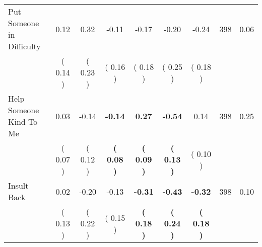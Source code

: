 \begin{tabular}{lcccccccc}
Put Someone in Difficulty &      0.12 &      0.32 &     -0.11 &     -0.17 &     -0.20 &     -0.24 & 398 &       0.06 \\ 
 & (     0.14 ) & (     0.23 ) & (     0.16 ) & (     0.18 ) & (     0.25 ) & (     0.18 ) & \\
Help Someone Kind To Me &      0.03 &     -0.14 & \textbf{    -0.14} & \textbf{     0.27} & \textbf{    -0.54} &      0.14 & 398 &       0.25 \\ 
 & (     0.07 ) & (     0.12 ) & \textbf{(     0.08 )} & \textbf{(     0.09 )} & \textbf{(     0.13 )} & (     0.10 ) & \\
Insult Back &      0.02 &     -0.20 &     -0.13 & \textbf{    -0.31} & \textbf{    -0.43} & \textbf{    -0.32} & 398 &       0.10 \\ 
 & (     0.13 ) & (     0.22 ) & (     0.15 ) & \textbf{(     0.18 )} & \textbf{(     0.24 )} & \textbf{(     0.18 )} & \\
\bottomrule
\end{tabular}
